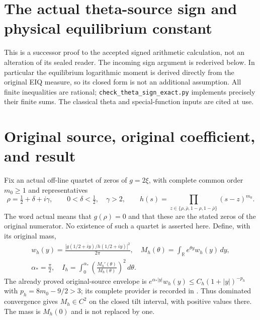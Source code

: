 \documentclass[11pt,a4paper]{article}
\begin{document}
\endgroup

\clearpage
\begingroup
\def\dd{\,d}

\setcounter{equation}{0}
\renewcommand{\theequation}{A02TS.\arabic{equation}}
\section*{The actual theta-source sign and physical equilibrium constant}



This is a successor proof to the accepted signed arithmetic calculation,
not an alteration of its sealed reader. The incoming sign argument is
rederived below. In particular the equilibrium logarithmic moment is
derived directly from the original EIQ measure, so its closed form is
not an additional assumption. All finite inequalities are rational;
\texttt{check\_theta\_sign\_exact.py} implements precisely their finite sums.
The classical theta and special-function inputs are cited at use.

\section{Original source, original coefficient, and result}
Fix an actual off-line quartet of zeros of $g=2\xi$, with complete common
order $m_0\geq1$ and representatives
\begin{equation}\tag{TS1}
 \rho=\tfrac12+\delta+i\gamma,\qquad 0<\delta<\tfrac12,\quad\gamma>2,
 \qquad
 h(s)=\prod_{z\in\{\rho,\bar\rho,1-\rho,1-\bar\rho\}}(s-z)^{m_0}.
\end{equation}
The word actual means that $g(\rho)=0$ and that these are the stated
zeros of the original numerator. No existence of such a quartet is
asserted here. Define, with its original mass,
\begin{equation}\tag{TS2}
\begin{gathered}
 w_h(y)=\frac{|g(1/2+iy)/h(1/2+iy)|^2}{2\pi},\quad
 M_h(\theta)=\int_{\mathbb R}e^{\theta y}w_h(y)\dd y,\\
 \alpha_*=\frac\pi2,\quad
 I_h=\int_0^{\alpha_*}\left(\frac{M_h'(\theta)}{M_h(\theta)}\right)^2\dd\theta.
\end{gathered}
\end{equation}
The already proved original-source envelope is
$e^{\alpha_*|y|}w_h(y)\leq C_h(1+|y|)^{-p_h}$ with
$p_h=8m_0-9/2>3$; its complete provider is recorded in
\cite{a02ts:SBV}. Thus dominated convergence gives $M_h\in C^2$
on the closed tilt interval, with positive values there. The mass is
$M_h(0)$ and is not replaced by one.
\end{document}
